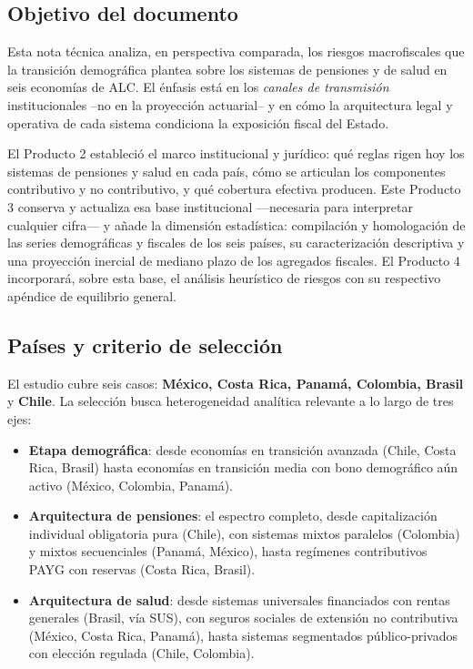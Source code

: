 \documentclass[12pt, letterpaper]{article}
\begin{document}
\subsection{Objetivo del documento}

Esta nota técnica analiza, en perspectiva comparada, los riesgos macrofiscales que
la transición demográfica plantea sobre los sistemas de pensiones y de salud en seis
economías de ALC. El énfasis está en los \textit{canales de transmisión}
institucionales --no en la proyección actuarial-- y en cómo la arquitectura legal y
operativa de cada sistema condiciona la exposición fiscal del Estado.

El Producto 2 estableció el marco institucional y jurídico: qué reglas rigen hoy
los sistemas de pensiones y salud en cada país, cómo se articulan los componentes
contributivo y no contributivo, y qué cobertura efectiva producen. Este Producto 3
conserva y actualiza esa base institucional ---necesaria para interpretar cualquier
cifra--- y añade la dimensión estadística: compilación y homologación de las series
demográficas y fiscales de los seis países, su caracterización descriptiva y una
proyección inercial de mediano plazo de los agregados fiscales. El Producto 4
incorporará, sobre esta base, el análisis heurístico de riesgos con su respectivo
apéndice de equilibrio general.

\subsection{Países y criterio de selección}

El estudio cubre seis casos: \textbf{México, Costa Rica, Panamá, Colombia, Brasil} y
\textbf{Chile}. La selección busca heterogeneidad analítica relevante a lo largo de
tres ejes:

\begin{itemize}
  \item \textbf{Etapa demográfica}: desde economías en transición avanzada (Chile,
        Costa Rica, Brasil) hasta economías en transición media con bono demográfico
        aún activo (México, Colombia, Panamá).
  \item \textbf{Arquitectura de pensiones}: el espectro completo, desde
        capitalización individual obligatoria pura (Chile), con sistemas
        mixtos paralelos (Colombia) y mixtos secuenciales (Panamá, México), hasta
        regímenes contributivos PAYG con reservas (Costa Rica, Brasil).
  \item \textbf{Arquitectura de salud}: desde sistemas universales financiados con
        rentas generales (Brasil, vía SUS), con seguros sociales de
        extensión no contributiva (México, Costa Rica, Panamá), hasta sistemas
        segmentados público-privados con elección regulada (Chile, Colombia).
\end{itemize}
\end{document}

